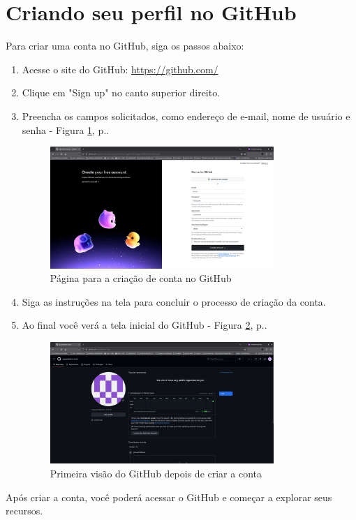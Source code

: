 \section{Criando seu perfil no GitHub}
Para criar uma conta no GitHub, siga os passos abaixo:
\begin{enumerate}
  \item Acesse o site do GitHub: \url{https://github.com/}
  \item Clique em "Sign up" no canto superior direito.
  \item Preencha os campos solicitados, como endereço de e-mail, nome de usuário e senha - Figura \ref{fig:signup_page}, p.\pageref{fig:signup_page}.
  \begin{figure}[H]
    \centering
    \includegraphics[width=0.8\textwidth]{./assets/images/01_signup_page.png}
    \caption{Página para a criação de conta no GitHub}
    \label{fig:signup_page}
  \end{figure}
  \item Siga as instruções na tela para concluir o processo de criação da conta.
  \item Ao final você verá a tela inicial do GitHub - Figura \ref{fig:signed_page}, p.\pageref{fig:signed_page}.
  \begin{figure}[H]
    \centering
    \includegraphics[width=0.8\textwidth]{./assets/images/02_signed_page.png}
    \caption{Primeira visão do GitHub depois de criar a conta}
    \label{fig:signed_page}
  \end{figure}
\end{enumerate}
\par
Após criar a conta, você poderá acessar o GitHub e começar a explorar seus recursos.
\par
